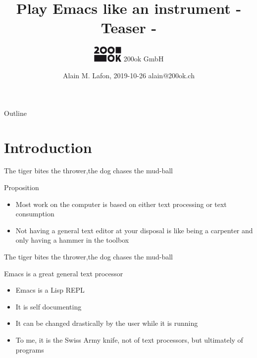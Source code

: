\documentclass[bigger]{beamer}
\author{\includegraphics[height=0.8cm]{images/Logo_200ok.png} \newline 200ok GmbH}
\date{Alain M. Lafon, 2019-10-26 \newline alain@200ok.ch}
\title{Play Emacs like an instrument \newline - Teaser -}
\begin{document}
\maketitle
\begin{frame}{Outline}
\tableofcontents
\end{frame}


\newcommand{\framedgraphic}[2][0.7] {
  \center\texttt{[image: \#2]}
}

\section{Introduction}
\label{sec:orga6ffc52}

\begin{frame}[label={sec:org38857b8}]{The tiger bites the thrower,\newline the dog chases the mud-ball}
\begin{block}{Proposition}
\begin{itemize}
\item Most work on the computer is based on either text processing or text
consumption
\item Not having a general text editor at your disposal is like being a
carpenter and only having a hammer in the toolbox
\end{itemize}
\end{block}
\end{frame}


\begin{frame}[label={sec:org2a4583a}]{The tiger bites the thrower,\newline the dog chases the mud-ball}
\begin{block}{Emacs is a great general text processor}
\begin{itemize}
\item Emacs is a \alert{Lisp REPL}
\item It is \alert{self documenting}
\item It can be \alert{changed drastically} by the user while it is running

\item To me, it is the Swiss Army knife, not of text processors, but
ultimately of programs
\end{itemize}
\end{block}
\end{frame}
\end{document}
